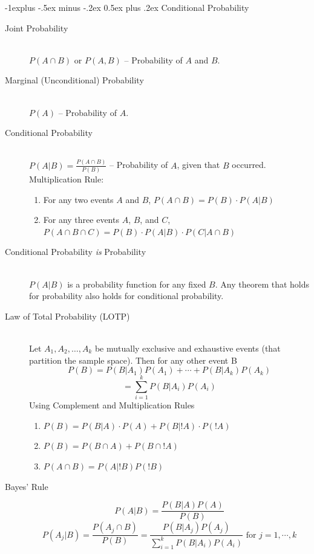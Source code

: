 \documentclass[10pt,landscape]{article}
\makeatletter
\renewcommand{\subsection}{\@startsection{subsection}{2}{0mm}%
                                {-1explus -.5ex minus -.2ex}%
                                {0.5ex plus .2ex}%
                                {\normalfont\normalsize\bfseries}}
\makeatother
\begin{document}
\begin{multicols}{3}
\subsection{Conditional Probability}
\begin{description}
\item[Joint Probability] \quad \\
  $P({A} \cap {B}) $ or $P({ A}, {B})$ -- Probability of ${ A}$ and ${B}$.
\item[Marginal (Unconditional) Probability] \quad \\
  $P({A})$ -- Probability of ${A}$.
\item[Conditional Probability] \quad \\
  $P(A|B) = \frac{P(A \cap B)}{P(B)}$ -- Probability of ${A}$, given that ${B}$ occurred.\\
	\vspace{5pt}
Multiplication Rule:
\begin{enumerate}
	\item For any two events $A$ and $B$, $P(A \cap B) = P(B) \cdot P(A|B)$
	\item For any three events $A$, $B$, and $C$, $P(A \cap B \cap C) = P(B) \cdot P(A|B) \cdot P(C|A \cap B)$  
\end{enumerate}
\item[Conditional Probability \emph{is} Probability] \quad \\
  $P({A}|{ B})$ is a probability function for any fixed $B$. Any theorem that holds for probability also holds for conditional probability.
\item[Law of Total Probability (LOTP)] \quad \\
Let $A_1 , A_2, \ldots, A_k$ be mutually exclusive and exhaustive events (that partition the sample space).  Then for any other event B
    \[P(B) = P(B|A_1)P(A_1) + \cdots +P(B|A_k)P(A_k)\]
    \[=\sum_{i=1}^{k} P(B|A_i)P(A_i)\]
Using Complement and Multiplication Rules
\begin {enumerate}
    \item $P(B) = P(B|A) \cdot P(A) + P(B|!A) \cdot P(!A)$
    \item $P(B) = P(B \cap A) + P(B \cap !A)$
    \item $P(A \cap B) = P(A|!B)P(!B)$
\end{enumerate}
\item[Bayes' Rule]
    \[P({ A}|{ B})  = \frac{P({ B}|{ A})P({ A})}{P({ B})}\]
    \[P(A_j|B) = \frac{P(A_j \cap B)}{P(B)} = \frac{P(B|A_j)P(A_j)}{\sum_{i=1}^{k} P(B|A_i)P(A_i)} \text{ for } j=1, \cdots, k\]
\end{description}


\end{multicols}
\end{document}
